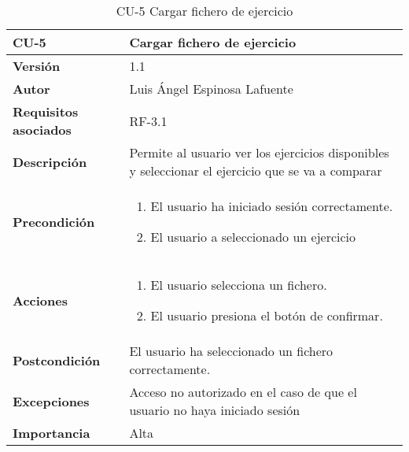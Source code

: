 \begin{table}[p]
	\centering
	\begin{tabularx}{\linewidth}{ p{} p{} }
		\toprule
		\textbf{CU-5}    & \textbf{Cargar fichero de ejercicio}\\
		\toprule
		\textbf{Versión}              & 1.1    \\
		\textbf{Autor}                &  Luis Ángel Espinosa Lafuente \\
		\textbf{Requisitos asociados} & RF-3.1\\
		\textbf{Descripción}          & Permite al usuario ver los ejercicios disponibles y seleccionar el ejercicio que se va a comparar\\
		\textbf{Precondición}         & 
		\begin{enumerate}
			\def\labelenumi{\arabic{enumi}.}
			\tightlist
			 \item  El usuario ha iniciado sesión correctamente.
			\item El usuario a seleccionado un ejercicio 
		\end{enumerate}\\
		\textbf{Acciones}             &
		\begin{enumerate}
			\def\labelenumi{\arabic{enumi}.}
			\tightlist
			\item El usuario selecciona un fichero.
			\item El usuario presiona el botón de confirmar.
		\end{enumerate}\\
		\textbf{Postcondición}        & El usuario ha seleccionado un fichero correctamente. \\
		\textbf{Excepciones}          & Acceso no autorizado en el caso de que el usuario no haya iniciado sesión \\
		\textbf{Importancia}          & Alta \\
		\bottomrule
	\end{tabularx}
	\caption{CU-5 Cargar fichero de ejercicio}
\end{table}


